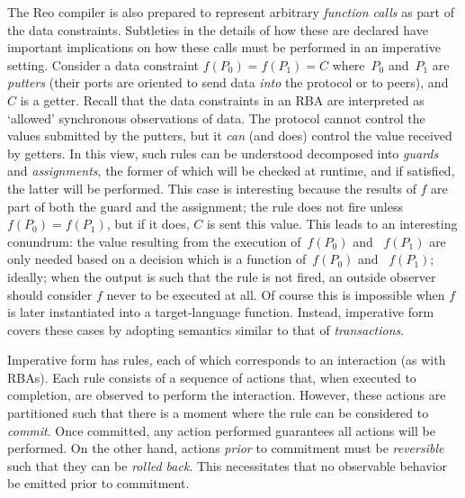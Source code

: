 The Reo compiler is also prepared to represent arbitrary \textit{function calls} as part of the data constraints. Subtleties in the details of how these are declared have important implications on how these calls must be performed in an imperative setting. Consider a data constraint $f(P_0)=f(P_1)=C$ where~$P_0$ and~$P_1$ are \textit{putters} (their ports are oriented to send data \textit{into} the protocol or to peers), and $C$ is a getter. Recall that the data constraints in an RBA are interpreted as `allowed' synchronous observations of data. The protocol cannot control the values submitted by the putters,  but it \textit{can} (and does) control the value received by getters. In this view, such rules can be understood decomposed into \textit{guards} and \textit{assignments}, the former of which will be checked at runtime, and if satisfied, the latter will be performed. This case is interesting because the results of $f$ are part of both the guard and the assignment; the rule does not fire unless $f(P_0)=f(P_1)$, but if it does, $C$ is sent this value. This leads to an interesting conundrum: the value resulting from the execution of~$f(P_0)$ and ~$f(P_1)$ are only needed based on a decision which is a function of~$f(P_0)$ and ~$f(P_1)$; ideally; when the output is such that the rule is not fired, an outside observer should consider $f$ never to be executed at all. Of course this is impossible when $f$ is later instantiated into a target-language function. Instead, imperative form covers these cases by adopting semantics similar to that of \textit{transactions}.

Imperative form has rules, each of which corresponds to an interaction (as with RBAs). Each rule consists of a sequence of actions that, when executed to completion, are observed to perform the interaction. However, these actions are partitioned such that there is a moment where the rule can be considered to \textit{commit}. Once committed, any action performed guarantees all actions will be performed. On the other hand, actions \textit{prior} to commitment must be \textit{reversible} such that they can be \textit{rolled back}. This necessitates that no observable behavior be emitted prior to commitment.

